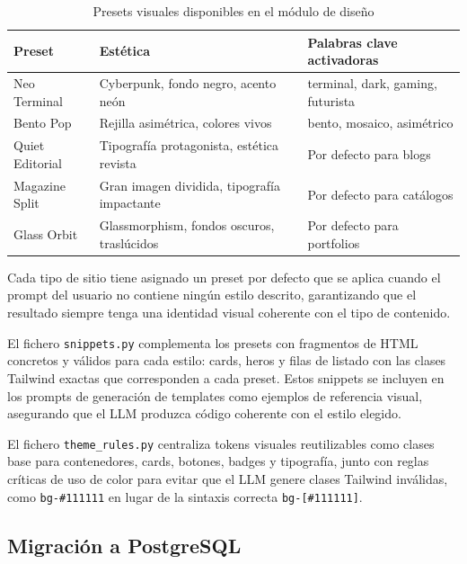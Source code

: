 \begin{table}[H]
    \centering
    \begin{tabular}{|l|l|p{5cm}|}
        \hline
        \textbf{Preset} & \textbf{Estética} & \textbf{Palabras clave activadoras} \\
        \hline
        Neo Terminal & Cyberpunk, fondo negro, acento neón & terminal, dark, gaming, futurista \\
        \hline
        Bento Pop & Rejilla asimétrica, colores vivos & bento, mosaico, asimétrico \\
        \hline
        Quiet Editorial & Tipografía protagonista, estética revista & Por defecto para blogs \\
        \hline
        Magazine Split & Gran imagen dividida, tipografía impactante & Por defecto para catálogos \\
        \hline
        Glass Orbit & Glassmorphism, fondos oscuros, traslúcidos & Por defecto para portfolios \\
        \hline
    \end{tabular}
    \caption{Presets visuales disponibles en el módulo de diseño}
    \label{tab:presets-visuales}
\end{table}

Cada tipo de sitio tiene asignado un preset por defecto que se aplica cuando el prompt del usuario no contiene ningún estilo descrito, garantizando que el resultado siempre tenga una identidad visual coherente con el tipo de contenido.

El fichero \texttt{snippets.py} complementa los presets con fragmentos de HTML concretos y válidos para cada estilo: cards, heros y filas de listado con las clases Tailwind exactas que corresponden a cada preset. Estos snippets se incluyen en los prompts de generación de templates como ejemplos de referencia visual, asegurando que el LLM produzca código coherente con el estilo elegido.

El fichero \texttt{theme\_rules.py} centraliza tokens visuales reutilizables como clases base para contenedores, cards, botones, badges y tipografía, junto con reglas críticas de uso de color para evitar que el LLM genere clases Tailwind inválidas, como \texttt{bg-\#111111} en lugar de la sintaxis correcta \texttt{bg-[\#111111]}.

\subsection{Migración a PostgreSQL}
\label{subsec:migracion-postgresql}

